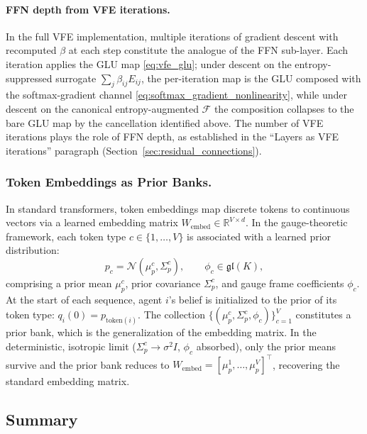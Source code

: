 \documentclass[twoside,11pt]{article}
\begin{document}
\paragraph{FFN depth from VFE iterations.}
In the full VFE implementation, multiple iterations of gradient descent with recomputed $\beta$ at each step constitute the analogue of the FFN sub-layer. Each iteration applies the GLU map \eqref{eq:vfe_glu}; under descent on the entropy-suppressed surrogate $\sum_j \beta_{ij} E_{ij}$, the per-iteration map is the GLU composed with the softmax-gradient channel \eqref{eq:softmax_gradient_nonlinearity}, while under descent on the canonical entropy-augmented $\mathcal{F}$ the composition collapses to the bare GLU map by the cancellation identified above. The number of VFE iterations plays the role of FFN depth, as established in the ``Layers as VFE iterations'' paragraph (Section~\ref{sec:residual_connections}).

\subsubsection{Token Embeddings as Prior Banks.}
\label{sec:embeddings}

In standard transformers, token embeddings map discrete tokens to continuous vectors via a learned embedding matrix $W_{\text{embed}} \in \mathbb{R}^{V \times d}$. In the gauge-theoretic framework, each token type $c \in \{1, \ldots, V\}$ is associated with a learned prior distribution:
\begin{equation}
p_c = \mathcal{N}(\mu_p^c, \Sigma_p^c), \qquad \phi_c \in \mathfrak{gl}(K),
\label{eq:prior_bank}
\end{equation}
comprising a prior mean $\mu_p^c$, prior covariance $\Sigma_p^c$, and gauge frame coefficients $\phi_c$. At the start of each sequence, agent $i$'s belief is initialized to the prior of its token type: $q_i(0) = p_{\mathrm{token}(i)}$. The collection $\{(\mu_p^c, \Sigma_p^c, \phi_c)\}_{c=1}^V$ constitutes a prior bank, which is the generalization of the embedding matrix. In the deterministic, isotropic limit ($\Sigma_p^c \to \sigma^2 I$, $\phi_c$ absorbed), only the prior means survive and the prior bank reduces to $W_{\text{embed}} = [\mu_p^1, \ldots, \mu_p^V]^\top$, recovering the standard embedding matrix.


\subsection{Summary}
\end{document}
